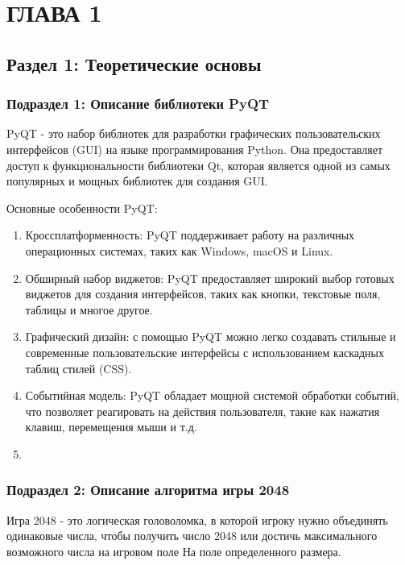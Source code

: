 \chapter{\label{ch:ch01}ГЛАВА 1} %

\section{\label{sec:ch01/sec01}Раздел 1: Теоретические основы}

\subsection{\label{subsec:ch01/sec01/sub01}Подраздел 1: Описание библиотеки PyQT}
PyQT - это набор библиотек для разработки графических пользовательских интерфейсов (GUI) на языке программирования Python. Она предоставляет доступ к функциональности библиотеки Qt, которая является одной из самых популярных и мощных библиотек для создания GUI.

Основные особенности PyQT:
\begin{enumerate}
\item Кроссплатформенность: PyQT поддерживает работу на различных операционных системах, таких как Windows, macOS и Linux.
\item Обширный набор виджетов: PyQT предоставляет широкий выбор готовых виджетов для создания интерфейсов, таких как кнопки, текстовые поля, таблицы и многое другое.
\item Графический дизайн: с помощью PyQT можно легко создавать стильные и современные пользовательские интерфейсы с использованием каскадных таблиц стилей (CSS).
\item  Событийная модель: PyQT обладает мощной системой обработки событий, что позволяет реагировать на действия пользователя, такие как нажатия клавиш, перемещения мыши и т.д.
\item 
\end{enumerate}

\subsection{\label{subsec:ch01/sec01/sub02}Подраздел 2: Описание алгоритма игры 2048}
Игра 2048 - это логическая головоломка, в которой игроку нужно объединять одинаковые числа, чтобы получить число 2048 или достичь максимального возможного числа на игровом поле На поле определенного размера.

